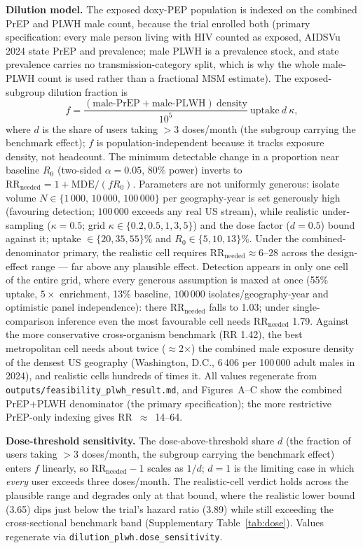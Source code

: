 \documentclass[11pt,a4paper]{article}
\begin{document}
\textbf{Dilution model.} The exposed doxy-PEP population is indexed on the
combined PrEP and PLWH male count, because the trial enrolled both (primary
specification: every male person living with HIV counted as exposed, AIDSVu 2024
state PrEP and prevalence; male PLWH is a prevalence stock, and state prevalence
carries no transmission-category split, which is why the whole male-PLWH count is
used rather than a fractional MSM estimate). The exposed-subgroup dilution
fraction is
\[f=\frac{(\text{male-PrEP}+\text{male-PLWH})\ \text{density}}{10^{5}}\ \text{uptake}\ d\ \kappa,\]
where $d$ is the share of users taking $>$3 doses/month (the subgroup carrying the
benchmark effect); $f$ is population-independent because it tracks exposure
density, not headcount. The minimum detectable change in a proportion near
baseline $R_0$ (two-sided $\alpha=0.05$, 80\% power) inverts to
$\mathrm{RR_{needed}}=1+\mathrm{MDE}/(f R_0)$. Parameters are not uniformly
generous: isolate volume $N\in\{1\,000,\,10\,000,\,100\,000\}$ per geography-year
is set generously high (favouring detection; $100\,000$ exceeds any real US
stream), while realistic under-sampling ($\kappa=0.5$; grid
$\kappa\in\{0.2,0.5,1,3,5\}$) and the dose factor ($d=0.5$) bound against it;
uptake $\in\{20,35,55\}\%$ and $R_0\in\{5,10,13\}\%$. Under the combined-denominator
primary, the realistic cell requires $\mathrm{RR_{needed}}\approx6$--$28$ across
the design-effect range --- far above any plausible effect. Detection appears in
only one cell of the entire grid, where every generous assumption is maxed at once
(55\% uptake, $5\times$ enrichment, 13\% baseline, $100\,000$
isolates/geography-year and optimistic panel independence): there
$\mathrm{RR_{needed}}$ falls to 1.03; under single-comparison inference even the
most favourable cell needs $\mathrm{RR_{needed}}$ 1.79. Against the more
conservative cross-organism benchmark (RR 1.42), the best metropolitan cell needs
about twice ($\approx$2$\times$) the combined male exposure density of the densest
US geography (Washington, D.C., 6\,406 per 100\,000 adult males in 2024), and
realistic cells hundreds of times it. All values regenerate from
\texttt{outputs/feasibility\_plwh\_result.md}, and Figures~A--C show the combined
PrEP+PLWH denominator (the primary specification); the more restrictive PrEP-only
indexing gives RR~$\approx$~14--64.

\textbf{Dose-threshold sensitivity.} The dose-above-threshold share $d$ (the
fraction of users taking $>$3 doses/month, the subgroup carrying the benchmark
effect) enters $f$ linearly, so $\mathrm{RR_{needed}}-1$ scales as $1/d$; $d=1$ is
the limiting case in which \emph{every} user exceeds three doses/month. The
realistic-cell verdict holds across the plausible range and degrades only at that
bound, where the realistic lower bound (3.65) dips just below the trial's hazard
ratio (3.89) while still exceeding the cross-sectional benchmark band
(Supplementary Table~\ref{tab:dose}). Values regenerate via
\texttt{dilution\_plwh.dose\_sensitivity}.
\end{document}
